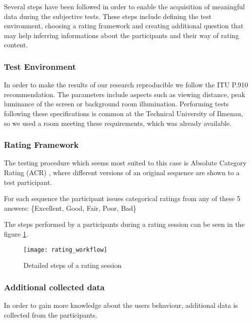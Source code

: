 Several steps have been followed in order to enable the acquisition of meaningful data during the subjective tests. These steps include defining the test environment, choosing a rating framework and creating additional question that may help inferring informations about the participants and their way of rating content.

\subsubsection{Test Environment}
In order to make the results of our research reproducible we follow the ITU P.910 \cite{rec1998p} recommendation. 
The parameters include aspects such as viewing distance, peak luminance of the screen or background room illumination.
Performing tests following these specifications is common at the Technical University of Ilmenau, so we used a room meeting these requirements, which was already available.

	
\subsubsection{Rating Framework}
The testing procedure which seems most suited to this case is Absolute Category Rating (ACR) \cite{rec1998p}, where different versions of an original sequence are shown to a test participant. 

For each sequence the participant issues categorical ratings from any of these 5 answers: \{Excellent, Good, Fair, Poor, Bad\}


The steps performed by a participants during a rating session can be seen in the figure \ref{fig:workflow:state_machine}.

\begin{figure}[h]
	\centering
	\texttt{[image: rating\_workflow]}
	\caption{Detailed steps of a rating session}
	\label{fig:workflow:state_machine}
\end{figure}

\subsubsection{Additional collected data}
In order to gain more knowledge about the users behaviour, additional data is collected from the participants.

